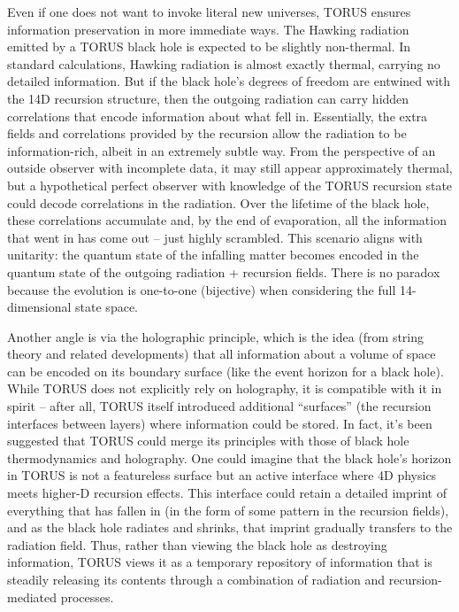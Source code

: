 \documentclass[
]{article}
\begin{document}
Even if one does not want to invoke literal new universes, TORUS ensures
information preservation in more immediate ways. The Hawking radiation
emitted by a TORUS black hole is expected to be slightly non-thermal. In
standard calculations, Hawking radiation is almost exactly thermal,
carrying no detailed information. But if the black hole's degrees of
freedom are entwined with the 14D recursion structure, then the outgoing
radiation can carry hidden correlations that encode information about
what fell in. Essentially, the extra fields and correlations provided by
the recursion allow the radiation to be information-rich, albeit in an
extremely subtle way. From the perspective of an outside observer with
incomplete data, it may still appear approximately thermal, but a
hypothetical perfect observer with knowledge of the TORUS recursion
state could decode correlations in the radiation. Over the lifetime of
the black hole, these correlations accumulate and, by the end of
evaporation, all the information that went in has come out -- just
highly scrambled. This scenario aligns with unitarity: the quantum state
of the infalling matter becomes encoded in the quantum state of the
outgoing radiation + recursion fields. There is no paradox because the
evolution is one-to-one (bijective) when considering the full
14-dimensional state space.

Another angle is via the holographic principle, which is the idea (from
string theory and related developments) that all information about a
volume of space can be encoded on its boundary surface (like the event
horizon for a black hole). While TORUS does not explicitly rely on
holography, it is compatible with it in spirit -- after all, TORUS
itself introduced additional ``surfaces'' (the recursion interfaces
between layers) where information could be stored. In fact, it's been
suggested that TORUS could merge its principles with those of black hole
thermodynamics and holography. One could imagine that the black hole's
horizon in TORUS is not a featureless surface but an active interface
where 4D physics meets higher-D recursion effects. This interface could
retain a detailed imprint of everything that has fallen in (in the form
of some pattern in the recursion fields), and as the black hole radiates
and shrinks, that imprint gradually transfers to the radiation field.
Thus, rather than viewing the black hole as destroying information,
TORUS views it as a temporary repository of information that is steadily
releasing its contents through a combination of radiation and
recursion-mediated processes.
\end{document}
